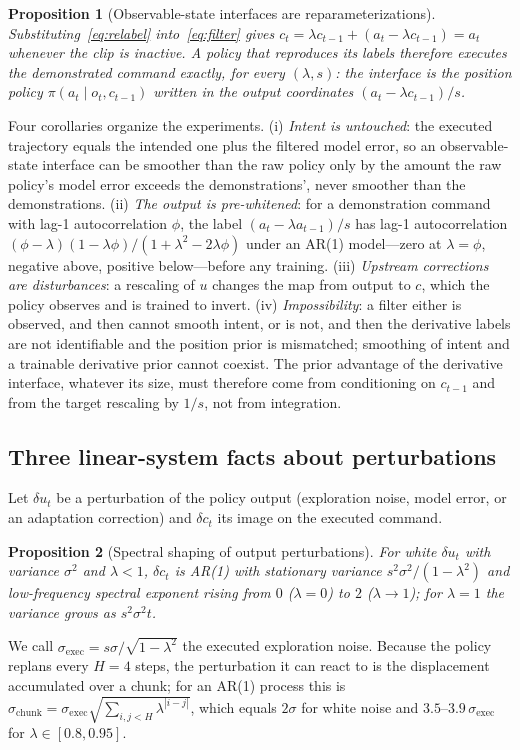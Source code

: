 \documentclass[conference]{IEEEtran}
\newtheorem{proposition}{Proposition}
\newcommand{\sexec}{\sigma_{\mathrm{exec}}}
\newcommand{\schunk}{\sigma_{\mathrm{chunk}}}
\begin{document}
\begin{proposition}[Observable-state interfaces are reparameterizations]
\label{prop:identity}
Substituting~\eqref{eq:relabel} into~\eqref{eq:filter} gives $c_t=\lambda c_{t-1}+(a_t-\lambda c_{t-1})=a_t$ whenever the clip is inactive. A policy that reproduces its labels therefore executes the demonstrated command exactly, for every $(\lambda,s)$: the interface is the position policy $\pi(a_t\mid o_t,c_{t-1})$ written in the output coordinates $(a_t-\lambda c_{t-1})/s$.
\end{proposition}
Four corollaries organize the experiments. (i) \emph{Intent is untouched}: the executed trajectory equals the intended one plus the filtered model error, so an observable-state interface can be smoother than the raw policy only by the amount the raw policy's model error exceeds the demonstrations', never smoother than the demonstrations. (ii) \emph{The output is pre-whitened}: for a demonstration command with lag-1 autocorrelation $\phi$, the label $(a_t-\lambda a_{t-1})/s$ has lag-1 autocorrelation $(\phi-\lambda)(1-\lambda\phi)/(1+\lambda^2-2\lambda\phi)$ under an AR(1) model---zero at $\lambda=\phi$, negative above, positive below---before any training. (iii) \emph{Upstream corrections are disturbances}: a rescaling of $u$ changes the map from output to $c$, which the policy observes and is trained to invert. (iv) \emph{Impossibility}: a filter either is observed, and then cannot smooth intent, or is not, and then the derivative labels are not identifiable and the position prior is mismatched; smoothing of intent and a trainable derivative prior cannot coexist. The prior advantage of the derivative interface, whatever its size, must therefore come from conditioning on $c_{t-1}$ and from the target rescaling by $1/s$, not from integration.

\subsection{Three linear-system facts about perturbations}

Let $\delta u_t$ be a perturbation of the policy output (exploration noise, model error, or an adaptation correction) and $\delta c_t$ its image on the executed command.

\begin{proposition}[Spectral shaping of output perturbations]
For white $\delta u_t$ with variance $\sigma^2$ and $\lambda<1$, $\delta c_t$ is AR(1) with stationary variance $s^2\sigma^2/(1-\lambda^2)$ and low-frequency spectral exponent rising from $0$ ($\lambda=0$) to $2$ ($\lambda\to1$); for $\lambda=1$ the variance grows as $s^2\sigma^2 t$.
\end{proposition}
We call $\sexec=s\sigma/\sqrt{1-\lambda^2}$ the executed exploration noise. Because the policy replans every $H=4$ steps, the perturbation it can react to is the displacement accumulated over a chunk; for an AR(1) process this is $\schunk=\sexec\sqrt{\sum_{i,j<H}\lambda^{|i-j|}}$, which equals $2\sigma$ for white noise and $3.5$--$3.9\,\sexec$ for $\lambda\in[0.8,0.95]$.
\end{document}
